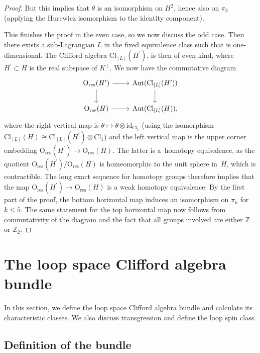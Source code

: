 \documentclass[10pt,a4paper]{amsart}
\numberwithin{equation}{section}
\newcommand{\Z}{\mathbb{Z}}
\newcommand{\Cl}{\mathrm{Cl}}
\newcommand{\id}{\mathrm{id}}
\newcommand{\res}{\mathrm{res}}
\newcommand{\Aut}{\mathrm{Aut}}
\renewcommand{\O}{\mathrm{O}}
\begin{document}
\begin{proof}
But this implies that $\theta$ is an isomorphism on $H^2$, hence also on $\pi_2$ (applying the Hurewicz isomorphism to the identity component).

This finishes the proof in the even case, so we now discuss the odd case.
Then there exists a sub-Lagrangian $L$ in the fixed equivalence class such that  is one-dimensional.
The Clifford algebra $\Cl_{[L]}(H^\prime)$, is then of even kind, where $H^\prime \subset H$ is the real subspace of $K^\perp$.
We now have the commutative diagram
\begin{equation*}
\begin{tikzcd}
 \O_{\res}(H^\prime) \ar[r] \ar[d]& \Aut(\Cl_{[L]}(H^\prime)) \ar[d]\\
 \O_{\res}(H) \ar[r]& \Aut(\Cl_{[L]}(H)),
\end{tikzcd}
\end{equation*}
where the right vertical map is $\theta \mapsto \theta \otimes \id_{\Cl_1}$ (using the isomorphism $\Cl_{[L]}(H) \cong \Cl_{[L]}(H^\prime) \otimes \Cl_1$) and the left vertical map is the upper corner embedding $\O_{\res}(H^\prime) \to \O_{\res}(H)$.
The latter is a~homotopy equivalence, as the quotient $\O_{\res}(H^\prime) / \O_{\res}(H)$ is homeomorphic to the unit sphere in~$H$, which is contractible.
The long exact sequence for homotopy groups therefore implies that the map $\O_{\res}(H^\prime) \to \O_{\res}(H)$ is a weak homotopy equivalence.
By the first part of the proof, the bottom horizontal map induces an isomorphism on $\pi_k$ for $k \leq 5$.
The same statement for the top horizontal map now follows from commutativity of the diagram and the fact that all groups involved are either $\Z$ or $\Z_2$.
\end{proof}


\section{The loop space Clifford algebra bundle}\label{sec4}

In this section, we define the loop space Clifford algebra bundle and calculate its characteristic classes.
We also discuss transgression and define the loop spin class.

\subsection{Definition of the bundle} \label{SectionLoopSpaceCliffordBundle}
\end{document}
